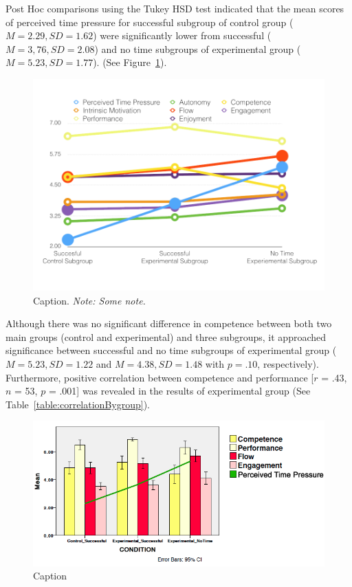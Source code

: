 Post Hoc comparisons using the Tukey HSD test indicated that the mean scores of perceived time pressure for successful subgroup of control group ($M = 2.29, SD = 1.62$) were significantly lower from successful ($M = 3,76, SD = 2.08$) and no time subgroups of experimental group ($M = 5.23, SD = 1.77$). (See Figure~\ref{fig:means}).

\begin{figure}[h]
\centering
\includegraphics [width=.9\textwidth,clip]{images/Figure_6_Results}
\caption[CaptionforListofFigures]{Caption. \it {Note: Some note.}}
\label {fig:means}
\end{figure}

Although there was no significant difference in competence between both two main groups (control and experimental) and three subgroups, it approached significance between successful and no time subgroups of experimental group ($M = 5.23, SD = 1.22$ and $M = 4.38, SD = 1.48$ with $p = .10$, respectively). Furthermore, positive correlation between competence and performance [$r$ = .43, $n$ = 53, $p$ = .001] was revealed in the results of experimental group (See Table~\ref{table:correlationBygroup}).  

\begin{figure}[h]
\centering
\includegraphics [width=1\textwidth,clip]{images/Figure_7_Discussion}
\caption[CaptionforListofFigures]{Caption}
\label {fig:subgroups}
\end{figure}


